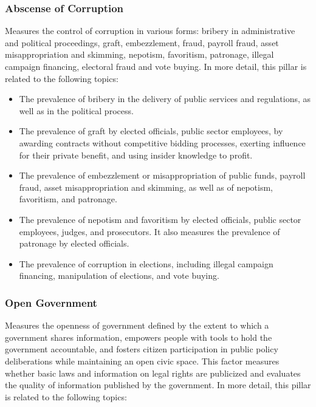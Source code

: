 \documentclass[
]{agujournal2019}
\providecommand{\tightlist}{%
  \setlength{\itemsep}{0pt}\setlength{\parskip}{0pt}}\usepackage{longtable,booktabs,array}
\begin{document}
\subsubsection{Abscense of Corruption}\label{abscense-of-corruption}

Measures the control of corruption in various forms: bribery in
administrative and political proceedings, graft, embezzlement, fraud,
payroll fraud, asset misappropriation and skimming, nepotism,
favoritism, patronage, illegal campaign financing, electoral fraud and
vote buying. In more detail, this pillar is related to the following
topics:

\begin{itemize}
\tightlist
\item
  The prevalence of bribery in the delivery of public services and
  regulations, as well as in the political process.
\item
  The prevalence of graft by elected officials, public sector employees,
  by awarding contracts without competitive bidding processes, exerting
  influence for their private benefit, and using insider knowledge to
  profit.
\item
  The prevalence of embezzlement or misappropriation of public funds,
  payroll fraud, asset misappropriation and skimming, as well as of
  nepotism, favoritism, and patronage.
\item
  The prevalence of nepotism and favoritism by elected officials, public
  sector employees, judges, and prosecutors. It also measures the
  prevalence of patronage by elected officials.
\item
  The prevalence of corruption in elections, including illegal campaign
  financing, manipulation of elections, and vote buying.
\end{itemize}

\subsubsection{Open Government}\label{open-government}

Measures the openness of government defined by the extent to which a
government shares information, empowers people with tools to hold the
government accountable, and fosters citizen participation in public
policy deliberations while maintaining an open civic space. This factor
measures whether basic laws and information on legal rights are
publicized and evaluates the quality of information published by the
government. In more detail, this pillar is related to the following
topics:
\end{document}
